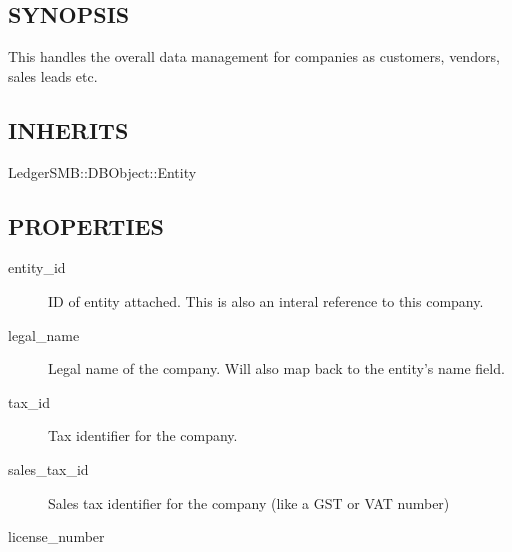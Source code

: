 \begin{description}
\begin{description}
\begin{description}
\begin{description}
\begin{description}
\begin{description}
\begin{description}
\begin{description}
\subsection*{SYNOPSIS\label{LedgerSMB::DBObject::Entity::Company_-_-_Company_business_handling_for_LedgerSMB_SYNOPSIS}}


This handles the overall data management for companies as customers, vendors, sales 
leads etc.

\subsection*{INHERITS\label{LedgerSMB::DBObject::Entity::Company_-_-_Company_business_handling_for_LedgerSMB_INHERITS}}
\begin{description}

\item[{LedgerSMB::DBObject::Entity}] \mbox{}\end{description}
\subsection*{PROPERTIES\label{LedgerSMB::DBObject::Entity::Company_-_-_Company_business_handling_for_LedgerSMB_PROPERTIES}}
\begin{description}

\item[{entity\_id}] \mbox{}

ID of entity attached.  This is also an interal reference to this company.


\item[{legal\_name}] \mbox{}

Legal name of the company.  Will also map back to the entity's name field.


\item[{tax\_id}] \mbox{}

Tax identifier for the company.


\item[{sales\_tax\_id}] \mbox{}

Sales tax identifier for the company (like a GST or VAT number)


\item[{license\_number}] \mbox{}


\end{description}
\end{description}
\end{description}
\end{description}
\end{description}
\end{description}
\end{description}
\end{description}
\end{description}
